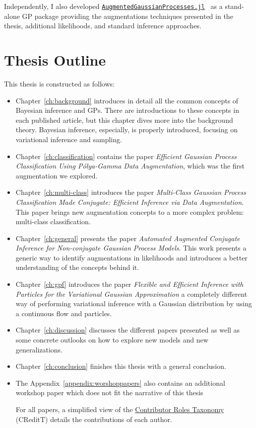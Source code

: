 Independently, I also developed \href{https://github.com/theogf/AugmentedGaussianProcesses.jl}{\texttt{AugmentedGaussianProcesses.jl}}~\cite{theo_galy_fajou_2021_5728215} as a stand-alone \ac{GP} package providing the augmentations techniques presented in the thesis, additional likelihoods, and standard inference approaches.

\section{Thesis Outline}

This thesis is constructed as follows:
\begin{itemize}
    \item Chapter~\ref{ch:background} introduces in detail all the common concepts of Bayesian inference and \acp{GP}.
    There are introductions to these concepts in each published article, but this chapter dives more into the background theory.
    Bayesian inference, especially, is properly introduced, focusing on variational inference and sampling.
    \item Chapter~\ref{ch:classification} contains the paper \textit{Efficient Gaussian Process Classification Using P\'olya-Gamma Data Augmentation}, which was the first augmentation we explored.
    \item Chapter~\ref{ch:multi-class} introduces the paper \textit{Multi-Class Gaussian Process Classification Made Conjugate: Efficient Inference via Data Augmentation}.
    This paper brings new augmentation concepts to a more complex problem: multi-class classification.
    \item Chapter~\ref{ch:general} presents the paper \textit{Automated Augmented Conjugate Inference for Non-conjugate Gaussian Process Models}.
    This work presents a generic way to identify augmentations in likelihoods and introduces a better understanding of the concepts behind it.
    \item Chapter~\ref{ch:gpf} introduces the paper \textit{Flexible and Efficient Inference with Particles for the Variational Gaussian Approximation } a completely different way of performing variational inference with a Gaussian distribution by using a continuous flow and particles.
    \item Chapter~\ref{ch:discussion} discusses the different papers presented as well as some concrete outlooks on how to explore new models and new generalizations.
    \item Chapter~\ref{ch:conclusion} finishes this thesis with a general conclusion.
    \item The Appendix~\ref{appendix:worshoppapers} also contains an additional workshop paper which does not fit the narrative of this thesis 

    For all papers, a simplified view of the \href{https://mdpi-res.com/data/contributor-role-instruction.pdf}{Contributor Roles Taxonomy} (CReditT) details the contributions of each author.

\end{itemize}

